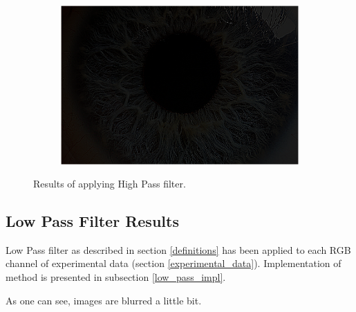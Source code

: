 \documentclass{article}
\begin{document}
\begin{figure}[H]
\begin{subfigure}{.09\textwidth}
\end{subfigure}%
\begin{subfigure}{.47\textwidth}
  \centering
  \includegraphics[width=0.97\linewidth]{_Figures/raw_data_4_highpass.png}
  \caption{}
  \label{fig:raw_4_highpass}
\end{subfigure}

\caption{Results of applying High Pass filter. }
\label{fig:highpass_results}
\end{figure}

%
%
\newpage
\subsection{Low Pass Filter Results}
Low Pass filter as described in section \ref{definitions} has been applied to each RGB channel of experimental data (section \ref{experimental_data}). Implementation of method is presented in subsection \ref{low_pass_impl}.

As one can see, images are blurred a little bit.
\end{document}
